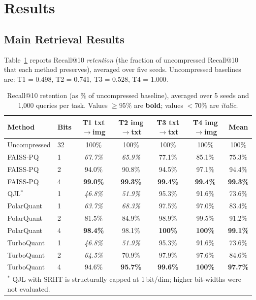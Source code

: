\documentclass[11pt]{article}
\begin{document}
\section{Results}

\subsection{Main Retrieval Results}

Table~\ref{tab:retention} reports Recall@10 \textit{retention} (the fraction of uncompressed
Recall@10 that each method preserves), averaged over five seeds. Uncompressed baselines are:
T1 = 0.498, T2 = 0.741, T3 = 0.528, T4 = 1.000.

\begin{table}[h!]
  \centering
  \caption{Recall@10 retention (as \% of uncompressed baseline), averaged over 5 seeds and 1{,}000 queries per task. Values $\geq 95\%$ are \textbf{bold}; values $< 70\%$ are \textit{italic}.}
  \label{tab:retention}
  \small
  \begin{tabular}{llccccc}
    \toprule
    \textbf{Method} & \textbf{Bits} & \textbf{T1 txt$\to$img} & \textbf{T2 img$\to$txt} & \textbf{T3 txt$\to$txt} & \textbf{T4 img$\to$img} & \textbf{Mean} \\
    \midrule
    Uncompressed & 32 & 100\% & 100\% & 100\% & 100\% & 100\% \\
    \midrule
    FAISS-PQ & 1 & \textit{67.7\%} & \textit{65.9\%} & 77.1\% & 85.1\% & 75.3\% \\
    FAISS-PQ & 2 & 94.0\% & 90.8\% & 94.5\% & 97.1\% & 94.4\% \\
    FAISS-PQ & 4 & \textbf{99.0\%} & \textbf{99.3\%} & \textbf{99.4\%} & \textbf{99.4\%} & \textbf{99.3\%} \\
    \midrule
    QJL$^*$ & 1 & \textit{46.8\%} & \textit{51.9\%} & 95.3\% & 91.6\% & 73.6\% \\
    \midrule
    PolarQuant & 1 & \textit{63.7\%} & \textit{68.3\%} & 97.5\% & 97.0\% & 83.4\% \\
    PolarQuant & 2 & 81.5\% & 84.9\% & 98.9\% & 99.5\% & 91.2\% \\
    PolarQuant & 4 & \textbf{98.4\%} & 98.1\% & \textbf{100\%} & \textbf{100\%} & \textbf{99.1\%} \\
    \midrule
    TurboQuant & 1 & \textit{46.8\%} & \textit{51.9\%} & 95.3\% & 91.6\% & 73.6\% \\
    TurboQuant & 2 & \textit{64.5\%} & 70.9\% & 97.9\% & 97.6\% & 84.6\% \\
    TurboQuant & 4 & 94.6\% & \textbf{95.7\%} & \textbf{99.6\%} & \textbf{100\%} & \textbf{97.7\%} \\
    \midrule
    \multicolumn{7}{l}{\footnotesize $^*$ QJL with SRHT is structurally capped at 1\,bit/dim; higher bit-widths were not evaluated.}
  \end{tabular}
\end{table}
\end{document}
